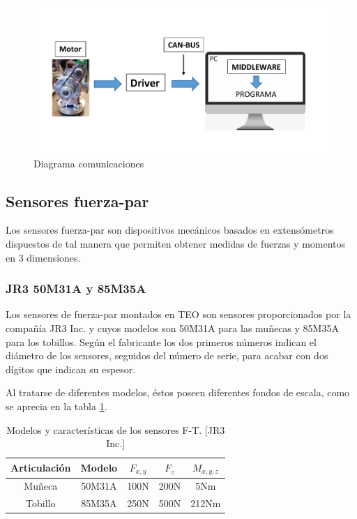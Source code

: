 \begin{figure}[H]
\centering
\includegraphics[scale=0.6]{imagenes/apartado_3/33_diagrama_comunicaciones.pdf}
\caption{Diagrama comunicaciones}
\label{figura33}
\end{figure}

\subsection{Sensores fuerza-par}

Los sensores fuerza-par son dispositivos mecánicos basados en extensómetros dispuestos de tal manera que permiten obtener medidas de fuerzas y momentos en 3 dimensiones.

\subsubsection{JR3 50M31A y 85M35A}
Los sensores de fuerza-par montados en TEO son sensores proporcionados por la compañía JR3 Inc. y cuyos modelos son 50M31A para las muñecas y 85M35A para los tobillos. Según el fabricante los dos primeros números indican el diámetro de los sensores, seguidos del número de serie, para acabar con dos dígitos que indican su espesor.

Al tratarse de diferentes modelos, éstos poseen diferentes fondos de escala, como se aprecia en la tabla \ref{tabla31}.

\begin{table}[H]
\begin{center}
    \begin{tabular}{| c | c | c | c | c |}
    \hline
    \rowcolor[gray]{0.7} Articulación & Modelo & $F_{x,y}$ & $F_{z}$ & $M_{x,y,z}$ \\ \hline
    \cellcolor[gray]{0.9}Muñeca & 50M31A & 100N & 200N & 5Nm \\ \hline
    \cellcolor[gray]{0.9}Tobillo & 85M35A & 250N & 500N & 212Nm\\ \hline
    \end{tabular}
\end{center}
\caption{Modelos y características de los sensores F-T. [JR3 Inc.]}
\label{tabla31}
\end{table}

